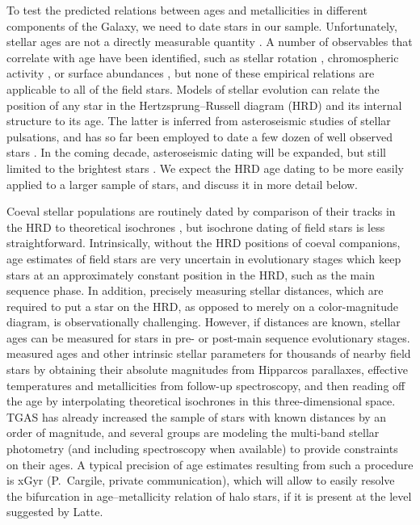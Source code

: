 \documentclass[apj, twocolappendix, numberedappendix, appendixfloats]{emulateapj}
\begin{document}
To test the predicted relations between ages and metallicities in different components of the Galaxy, we need to date stars in our sample.
Unfortunately, stellar ages are not a directly measurable quantity \citep[for a recent review, see][]{soderblom2010}.
A number of observables that correlate with age have been identified, such as stellar rotation \citep{barnes2007}, chromospheric activity \citep{mamajek2008}, or surface abundances \citep{ness2016}, but none of these empirical relations are applicable to all of the field stars.
Models of stellar evolution can relate the position of any star in the Hertzsprung--Russell diagram (HRD) and its internal structure to its age.
The latter is inferred from asteroseismic studies of stellar pulsations, and has so far been employed to date a few dozen of well observed stars \citep[e.g.,][]{keplerages}.
In the coming decade, asteroseismic dating will be expanded, but still limited to the brightest stars \citep{tess, plato}.
We expect the HRD age dating to be more easily applied to a larger sample of stars, and discuss it in more detail below.

Coeval stellar populations are routinely dated by comparison of their tracks in the HRD to theoretical isochrones \citep[e.g.,][]{sandage1970, chaboyer1998, dotter2007}, but isochrone dating of field stars is less straightforward.
Intrinsically, without the HRD positions of coeval companions, age estimates of field stars are very uncertain in evolutionary stages which keep stars at an approximately constant position in the HRD, such as the main sequence phase.
In addition, precisely measuring stellar distances, which are required to put a star on the HRD, as opposed to merely on a color-magnitude diagram, is observationally challenging.
However, if distances are known, stellar ages can be measured for stars in pre- or post-main sequence evolutionary stages.
\citet{gcs} measured ages and other intrinsic stellar parameters for thousands of nearby field stars by obtaining their absolute magnitudes from Hipparcos parallaxes, effective temperatures and metallicities from follow-up spectroscopy, and then reading off the age by interpolating theoretical isochrones in this three-dimensional space.
TGAS has already increased the sample of stars with known distances by an order of magnitude, and several groups are modeling the multi-band stellar photometry (and including spectroscopy when available) to provide constraints on their ages.
A typical precision of age estimates resulting from such a procedure is x\;Gyr (P.~Cargile, private communication), which will allow to easily resolve the bifurcation in age--metallicity relation of halo stars, if it is present at the level suggested by Latte.
\end{document}
